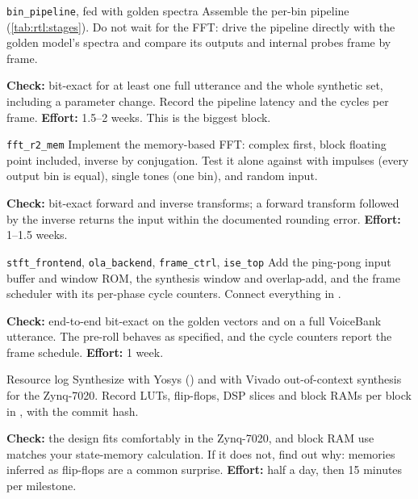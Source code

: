 \begin{stepbox}[label=st:rtl:binpipe]{\texttt{bin\_pipeline}, fed with golden spectra}
Assemble the per-bin pipeline (\cref{tab:rtl:stages}). Do not wait for the FFT:
drive the pipeline directly with the golden model's spectra and compare its
outputs and internal probes frame by frame.

\textbf{Check:} bit-exact for at least one full utterance and the whole
synthetic set, including a parameter change. Record the pipeline latency and the
cycles per frame. \textbf{Effort:} 1.5--2 weeks. This is the biggest block.
\end{stepbox}

\begin{stepbox}[label=st:rtl:fft]{\texttt{fft\_r2\_mem}}
Implement the memory-based FFT: complex first, block floating point included,
inverse by conjugation. Test it alone against  with
impulses (every output bin is equal), single tones (one bin), and random input.

\textbf{Check:} bit-exact forward and inverse transforms; a forward transform
followed by the inverse returns the input within the documented rounding error.
\textbf{Effort:} 1--1.5 weeks.
\end{stepbox}

\begin{stepbox}[label=st:rtl:top]{\texttt{stft\_frontend}, \texttt{ola\_backend}, \texttt{frame\_ctrl}, \texttt{ise\_top}}
Add the ping-pong input buffer and window ROM, the synthesis window and
overlap-add, and the frame scheduler with its per-phase cycle counters. Connect
everything in .

\textbf{Check:} end-to-end bit-exact on the golden vectors and on a full
VoiceBank utterance. The pre-roll behaves as specified, and the cycle counters
report the frame schedule. \textbf{Effort:} 1 week.
\end{stepbox}

\begin{stepbox}[label=st:rtl:resources]{Resource log}
Synthesize  with Yosys () and with Vivado
out-of-context synthesis for the Zynq-7020. Record LUTs, flip-flops, DSP slices
and block RAMs per block in , with the commit hash.

\textbf{Check:} the design fits comfortably in the Zynq-7020, and block RAM use
matches your state-memory calculation. If it does not, find out why: memories
inferred as flip-flops are a common surprise. \textbf{Effort:} half a day,
then 15 minutes per milestone.
\end{stepbox}

